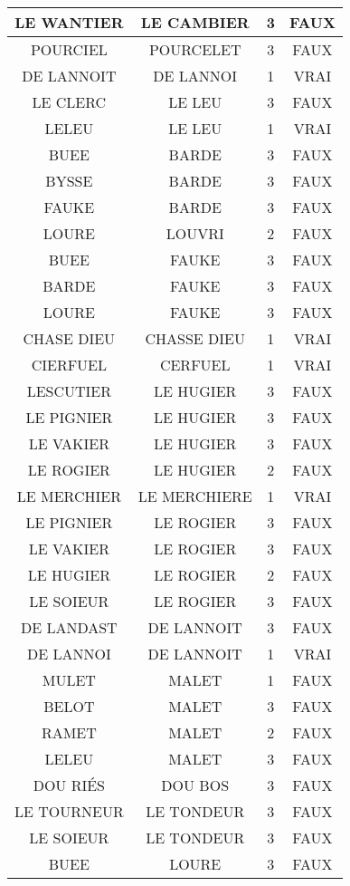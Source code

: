 \begin{center}
\begin{longtable}{|c|c|c|c|}
\hline	LE WANTIER	&	LE CAMBIER	&	3	&	FAUX	\\
\hline	POURCIEL	&	POURCELET	&	3	&	FAUX	\\
\hline	DE LANNOIT	&	DE LANNOI	&	1	&	VRAI	\\
\hline	LE CLERC	&	LE LEU	&	3	&	FAUX	\\
\hline	LELEU	&	LE LEU	&	1	&	VRAI	\\
\hline	BUEE	&	BARDE	&	3	&	FAUX	\\
\hline	BYSSE	&	BARDE	&	3	&	FAUX	\\
\hline	FAUKE	&	BARDE	&	3	&	FAUX	\\
\hline	LOURE	&	LOUVRI	&	2	&	FAUX	\\
\hline	BUEE	&	FAUKE	&	3	&	FAUX	\\
\hline	BARDE	&	FAUKE	&	3	&	FAUX	\\
\hline	LOURE	&	FAUKE	&	3	&	FAUX	\\
\hline	CHASE DIEU	&	CHASSE DIEU	&	1	&	VRAI	\\
\hline	CIERFUEL	&	CERFUEL	&	1	&	VRAI	\\
\hline	LESCUTIER	&	LE HUGIER	&	3	&	FAUX	\\
\hline	LE PIGNIER	&	LE HUGIER	&	3	&	FAUX	\\
\hline	LE VAKIER	&	LE HUGIER	&	3	&	FAUX	\\
\hline	LE ROGIER	&	LE HUGIER	&	2	&	FAUX	\\
\hline	LE MERCHIER	&	LE MERCHIERE	&	1	&	VRAI	\\
\hline	LE PIGNIER	&	LE ROGIER	&	3	&	FAUX	\\
\hline	LE VAKIER	&	LE ROGIER	&	3	&	FAUX	\\
\hline	LE HUGIER	&	LE ROGIER	&	2	&	FAUX	\\
\hline	LE SOIEUR	&	LE ROGIER	&	3	&	FAUX	\\
\hline	DE LANDAST	&	DE LANNOIT	&	3	&	FAUX	\\
\hline	DE LANNOI	&	DE LANNOIT	&	1	&	VRAI	\\
\hline	MULET	&	MALET	&	1	&	FAUX	\\
\hline	BELOT	&	MALET	&	3	&	FAUX	\\
\hline	RAMET	&	MALET	&	2	&	FAUX	\\
\hline	LELEU	&	MALET	&	3	&	FAUX	\\
\hline	DOU RIÉS	&	DOU BOS	&	3	&	FAUX	\\
\hline	LE TOURNEUR	&	LE TONDEUR	&	3	&	FAUX	\\
\hline	LE SOIEUR	&	LE TONDEUR	&	3	&	FAUX	\\
\hline	BUEE	&	LOURE	&	3	&	FAUX	\\

\end{longtable}
\end{center}
